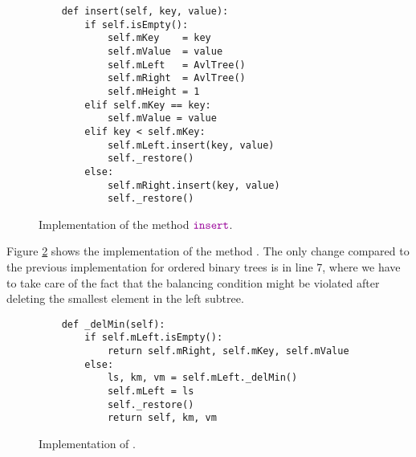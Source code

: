 \begin{figure}[!ht]
\centering
\begin{verbatim}
    def insert(self, key, value):
        if self.isEmpty():
            self.mKey    = key
            self.mValue  = value
            self.mLeft   = AvlTree()
            self.mRight  = AvlTree()
            self.mHeight = 1
        elif self.mKey == key:
            self.mValue = value
        elif key < self.mKey:
            self.mLeft.insert(key, value)
            self._restore()
        else:
            self.mRight.insert(key, value)
            self._restore()
\end{verbatim}
\vspace*{-0.3cm}
\caption{Implementation of the method $\mytt{insert}$.}
\label{fig:avl-tree.ipython:insert}
\end{figure}

Figure \ref{fig:avl-tree.ipython:delMin} shows the implementation of the method .
The only change compared to the previous implementation for ordered binary trees is in line 7, where
we have to take care of the fact that the balancing condition might be violated after deleting the
smallest element in the left subtree.

\begin{figure}[!ht]
\centering
\begin{verbatim}
    def _delMin(self):
        if self.mLeft.isEmpty():
            return self.mRight, self.mKey, self.mValue
        else:
            ls, km, vm = self.mLeft._delMin()
            self.mLeft = ls
            self._restore()
            return self, km, vm
\end{verbatim}
\vspace*{-0.3cm}
\caption{Implementation of .}
\label{fig:avl-tree.ipython:delMin}
\end{figure}


